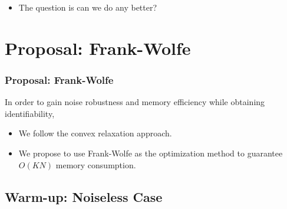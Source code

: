 \documentclass[10pt,xcolor={usenames,dvipsnames,table}]{beamer}
\begin{document}
\begin{frame}
{\begin{itemize}
            As an example, FastGradient is a method following this approach and is considered as state-of-the-art. We run FastGradient on  synthetic data and measure its memory consumption. We can see that memory cost grows quadratically to $N$. This memory cost prohibits this approach's applicability to large scale problem when $N$ could reach to 100000.
        \item The question is can we do any better?
    \end{itemize}
    }
\end{frame}

\section{Proposal: Frank-Wolfe}%
\label{sec:what_are_we_proposing_}

\begin{frame}
    \frametitle{Proposal: Frank-Wolfe}
    In order to gain noise robustness and memory efficiency while obtaining identifiability,
    \begin{itemize}
        \item We follow the convex relaxation approach.
        \item We propose to use Frank-Wolfe as the optimization method to guarantee  $O(KN)$ memory consumption.
    \end{itemize}
\end{frame}

\subsection{Warm-up: Noiseless Case}%
\end{document}
